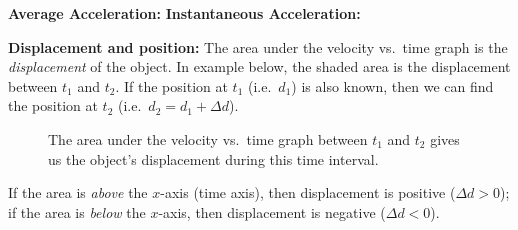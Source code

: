 \textbf{Average Acceleration:}
%
%
%
\textbf{Instantaneous Acceleration:}



\textbf{Displacement and position:} The area under the velocity vs.\ time graph
is the \emph{displacement} of the object. In example below, the shaded area is
the displacement between $t_1$ and $t_2$. If the position at $t_1$ (i.e.\
$d_1$) is also known, then we can find the position at $t_2$ (i.e.\
$d_2=d_1+\Delta d$).
\begin{figure}[ht]
  \centering
  \caption{The area under the velocity vs.\ time graph between $t_1$ and $t_2$
    gives us the object's displacement during this time interval.}
  \label{fig:area-under-vt-graph}
\end{figure}
If the area is \emph{above} the $x$-axis (time axis), then displacement
is positive ($\Delta d>0$); if the area is \emph{below} the $x$-axis, then
displacement is negative ($\Delta d<0$).



